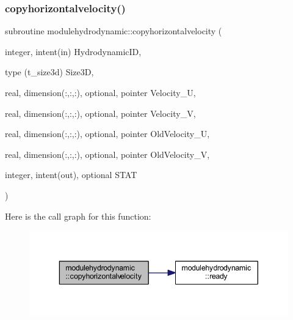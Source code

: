 \subsubsection{\texorpdfstring{copyhorizontalvelocity()}{copyhorizontalvelocity()}}
{\footnotesize\ttfamily subroutine modulehydrodynamic\+::copyhorizontalvelocity (\begin{DoxyParamCaption}\item[{integer, intent(in)}]{Hydrodynamic\+ID,  }\item[{type (t\+\_\+size3d)}]{Size3D,  }\item[{real, dimension(\+:,\+:,\+:), optional, pointer}]{Velocity\+\_\+U,  }\item[{real, dimension(\+:,\+:,\+:), optional, pointer}]{Velocity\+\_\+V,  }\item[{real, dimension(\+:,\+:,\+:), optional, pointer}]{Old\+Velocity\+\_\+U,  }\item[{real, dimension(\+:,\+:,\+:), optional, pointer}]{Old\+Velocity\+\_\+V,  }\item[{integer, intent(out), optional}]{S\+T\+AT }\end{DoxyParamCaption})\hspace{0.3cm}{\ttfamily [private]}}

Here is the call graph for this function\+:\nopagebreak
\begin{figure}[H]
\begin{center}
\leavevmode
\includegraphics[width=343pt]{namespacemodulehydrodynamic_af9f7b027775cfbeb5d359cec2be0b0ad_cgraph}
\end{center}
\end{figure}
\mbox{\label{namespacemodulehydrodynamic_a69bb56671a822946694acb66f9417d61}} 

